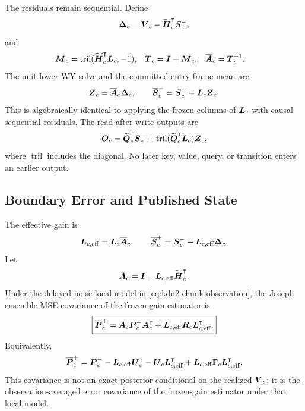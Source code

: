 \documentclass[11pt,letterpaper,logo]{yalearxiv}
\newcommand{\tril}{\operatorname{tril}}
\begin{document}
The residuals remain sequential. Define
\begin{equation}
  \boldsymbol{\Delta}_c
  =
  \boldsymbol{V}_c-\widetilde{\boldsymbol{H}}_c^{\intercal}\boldsymbol{S}_c^-,
  \label{eq:kdn2-boundary-residual}
\end{equation}
and
\begin{equation}
\begin{aligned}
  \ve{M}_c
  &=
  \tril(\widetilde{\ve{H}}_c^{\tr}\ve{L}_c,-1),
  &
  \ve{T}_c
  &=
  \ve{I}+\ve{M}_c,
  &
  \overline{\ve{A}}_c
  &=
  \ve{T}_c^{-1}.
\end{aligned}
\label{eq:kdn2-wy-system}
\end{equation}
The unit-lower WY solve and the committed entry-frame mean are
\begin{equation}
  \boldsymbol{Z}_c
  =
  \overline{\boldsymbol{A}}_c\boldsymbol{\Delta}_c,
  \qquad
  \overline{\boldsymbol{S}}_c^+
  =
  \boldsymbol{S}_c^-+\boldsymbol{L}_c\boldsymbol{Z}_c.
  \label{eq:kdn2-wy-commit}
\end{equation}
This is algebraically identical to applying the frozen columns of $\boldsymbol{L}_c$ with causal
sequential residuals. The read-after-write outputs are
\begin{equation}
  \ve{O}_c
  =
  \widetilde{\ve{Q}}_c^{\tr}\ve{S}_c^-
  +
  \tril(\widetilde{\ve{Q}}_c^{\tr}\ve{L}_c)\ve{Z}_c,
  \label{eq:kdn2-causal-output}
\end{equation}
where $\tril$ includes the diagonal. No later key, value, query, or transition enters an earlier
output.

\subsection{Boundary Error and Published State}
\label{sec:kdn2-joseph}

The effective gain is
\begin{equation}
  \boldsymbol{L}_{c,\mathrm{eff}}
  =
  \boldsymbol{L}_c\overline{\boldsymbol{A}}_c,
  \qquad
  \overline{\boldsymbol{S}}_c^+
  =
  \boldsymbol{S}_c^-+\boldsymbol{L}_{c,\mathrm{eff}}\boldsymbol{\Delta}_c.
  \label{eq:kdn2-effective-gain}
\end{equation}
Let
\begin{equation}
  \boldsymbol{A}_c
  =
  \boldsymbol{I}
  -
  \boldsymbol{L}_{c,\mathrm{eff}}\widetilde{\boldsymbol{H}}_c^{\intercal}.
  \label{eq:kdn2-error-transition}
\end{equation}
Under the delayed-noise local model in \eqref{eq:kdn2-chunk-observation}, the Joseph ensemble-MSE
covariance of the frozen-gain estimator is
\begin{equation}
  \boxed{
  \overline{\boldsymbol{P}}_c^+
  =
  \boldsymbol{A}_c\boldsymbol{P}_c^-\boldsymbol{A}_c^{\intercal}
  +
  \boldsymbol{L}_{c,\mathrm{eff}}\boldsymbol{R}_c
  \boldsymbol{L}_{c,\mathrm{eff}}^{\intercal}.}
  \label{eq:kdn2-joseph}
\end{equation}
Equivalently,
\begin{equation}
  \overline{\boldsymbol{P}}_c^+
  =
  \boldsymbol{P}_c^-
  -\boldsymbol{L}_{c,\mathrm{eff}}\boldsymbol{U}_c^{\intercal}
  -\boldsymbol{U}_c\boldsymbol{L}_{c,\mathrm{eff}}^{\intercal}
  +\boldsymbol{L}_{c,\mathrm{eff}}\boldsymbol{\Gamma}_c
   \boldsymbol{L}_{c,\mathrm{eff}}^{\intercal}.
  \label{eq:kdn2-joseph-expanded}
\end{equation}
This covariance is not an exact posterior conditional on the realized $\boldsymbol{V}_c$; it is the
observation-averaged error covariance of the frozen-gain estimator under that local model.
\end{document}
